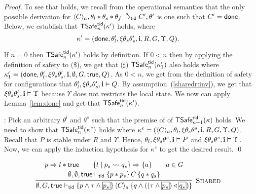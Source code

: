 \begin{proof}
To see that  holds, 
we recall from the operational semantics that the only possible derivation for 
$\langle C \rangle_a, \theta_l * \theta_s * \theta_f \stackrel{a}{\rightarrow}_{{\sf tid}} C',\theta'$ 
is one such that $C'={\sf done}$.
Below, we establish that ${\sf TSafe}^{{\sf tid}}_{n}(\kappa')$ holds, where 
$$
\kappa' = ({\sf done}, \theta'_l,\xi\theta_s\theta_s',{\bf i},R,G,\Upsilon, Q).
$$

If $n=0$ then ${\sf TSafe}^{{\sf tid}}_{n}(\kappa')$ holds by definition.
If $0 < n$ then by applying the definition of safety to ($\$$), %
we get that ($\sharp$) ${\sf TSafe}^{{\sf tid}}_{n}(\kappa_1')$ also 
holds where $\kappa_1'=({\sf done}, \theta'_l,\xi\theta_s\theta_s',{\bf i},\emptyset,G,\mathsf{true}, Q)$. 
As $0<n$, we get from the definition of safety for configurations that 
$\theta'_l,\xi\theta_s\theta_s',{\bf i} \vDash Q$.
By assumption~(\ref{sharedr:inv}), we get that $\xi\theta_s\theta_s',{\bf i} \vDash \Upsilon$
because $\Upsilon$ does not restricts the local state.
We now can apply Lemma~\ref{lem:done} and get that ${\sf TSafe}^{{\sf tid}}_{n}(\kappa')$.
 
: 
Pick an arbitrary $\theta^l$ and $\theta^s$ such that the 
premise of  of ${\sf TSafe}^{{\sf tid}}_{n+1}(\kappa)$ holds. 
We need to show that ${\sf TSafe}^{{\sf tid}}_n(\kappa^e)$ holds where 
$\kappa^e = (\langle C \rangle_a, \theta_l,\xi\theta_s\theta^s,{\bf i},R,G,\Upsilon, Q)$.
Recall that $P$ is stable under $R$ and $\Upsilon$.
Hence, $\theta_l,\xi\theta_s\theta^s,{\bf i} \vDash P$ and $\xi\theta_s\theta^s,{\bf i} \vDash \Upsilon$.
Now, we can apply the induction hypothesis for $\kappa^e$ to get the desired result.
\qed\end{proof}

\[
\infer[\textsc{Shared}]{
\emptyset, G, \true \tvdash \{p \wedge  \tau \wedge \shareds{p_s}\}\, 
\langle C\rangle_a\, 
\{ q \wedge ((\tau \wedge \shareds{p_s}) \extend \shareds{q_s}) \}
}{
\begin{array}{c}
p \Rightarrow l * \true
\qquad
\{l \mid p_s \leadsto q_s\} \Rightarrow \{a\} 
\qquad
a \in G
\\[2pt]
\emptyset,\emptyset,\true \tvdash \{ p * p_s \} \,C\, \{ q * q_s \}
\end{array}
}
\\[10pt]
\]


